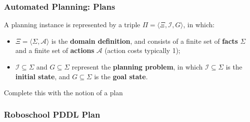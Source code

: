 \documentclass{beamer}
\newcommand{\todo}[1]{ {\color{red} #1} }
\begin{document}
	\begin{frame}[c]\frametitle{Automated Planning: Plans}
		\begin{definition} 
			A planning instance is represented by a triple $\Pi = \langle \Xi, \mathcal{I}, G\rangle$, in which:
			\begin{itemize}
				\item $\Xi = \langle \Sigma, \mathcal{A} \rangle$ is the \textbf{domain definition}, and consists of a finite set of \textbf{facts} $\Sigma$ and a finite set of \textbf{actions} $\mathcal{A}$ (action costs typically 1);
				\item $\mathcal{I} \subseteq \Sigma$ and $G \subseteq \Sigma$ represent the \textbf{planning problem}, in which $\mathcal{I} \subseteq \Sigma$ is the \textbf{initial state}, and $G \subseteq \Sigma$ is the \textbf{goal state}.
			\end{itemize}
		\end{definition}
		\todo{Complete this with the notion of a plan}
	\end{frame}
	
	\begin{frame}[c]\frametitle{Roboschool PDDL Plan}
		
	\end{frame}
	
\end{document}
